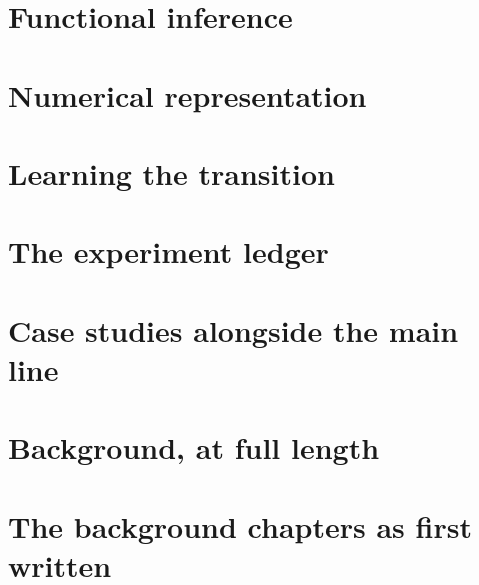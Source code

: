 \documentclass[11pt,a4paper]{report}
\theoremstyle{plain}
\theoremstyle{definition}
\theoremstyle{remark}
\begin{document}
\part{Functional inference}




\part{Numerical representation}


\part{Learning the transition}


\part{The experiment ledger}


\part{Case studies alongside the main line}


\part{Background, at full length}




\part{The background chapters as first written}






\end{document}
